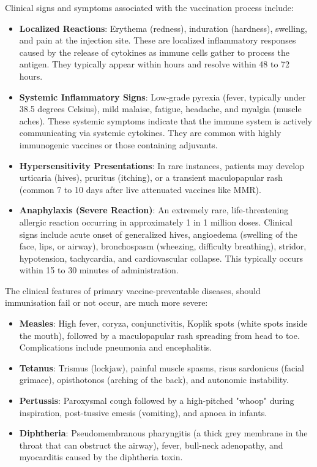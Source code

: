 Clinical signs and symptoms associated with the vaccination process include:
\begin{itemize}
    \item \textbf{Localized Reactions}: Erythema (redness), induration (hardness), swelling, and pain at the injection site. These are localized inflammatory responses caused by the release of cytokines as immune cells gather to process the antigen. They typically appear within hours and resolve within 48 to 72 hours.
    \item \textbf{Systemic Inflammatory Signs}: Low-grade pyrexia (fever, typically under 38.5 degrees Celsius), mild malaise, fatigue, headache, and myalgia (muscle aches). These systemic symptoms indicate that the immune system is actively communicating via systemic cytokines. They are common with highly immunogenic vaccines or those containing adjuvants.
    \item \textbf{Hypersensitivity Presentations}: In rare instances, patients may develop urticaria (hives), pruritus (itching), or a transient maculopapular rash (common 7 to 10 days after live attenuated vaccines like MMR).
    \item \textbf{Anaphylaxis (Severe Reaction)}: An extremely rare, life-threatening allergic reaction occurring in approximately 1 in 1 million doses. Clinical signs include acute onset of generalized hives, angioedema (swelling of the face, lips, or airway), bronchospasm (wheezing, difficulty breathing), stridor, hypotension, tachycardia, and cardiovascular collapse. This typically occurs within 15 to 30 minutes of administration.
\end{itemize}

The clinical features of primary vaccine-preventable diseases, should immunisation fail or not occur, are much more severe:
\begin{itemize}
    \item \textbf{Measles}: High fever, coryza, conjunctivitis, Koplik spots (white spots inside the mouth), followed by a maculopapular rash spreading from head to toe. Complications include pneumonia and encephalitis.
    \item \textbf{Tetanus}: Trismus (lockjaw), painful muscle spasms, risus sardonicus (facial grimace), opisthotonos (arching of the back), and autonomic instability.
    \item \textbf{Pertussis}: Paroxysmal cough followed by a high-pitched "whoop" during inspiration, post-tussive emesis (vomiting), and apnoea in infants.
    \item \textbf{Diphtheria}: Pseudomembranous pharyngitis (a thick grey membrane in the throat that can obstruct the airway), fever, bull-neck adenopathy, and myocarditis caused by the diphtheria toxin.
\end{itemize}

